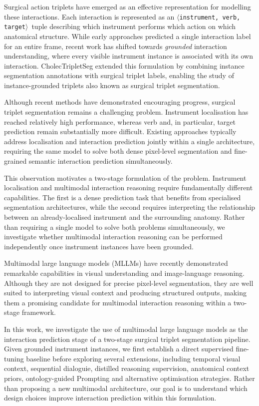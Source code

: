 \documentclass[11pt]{article}
\newcommand{\ivttriplet}{\texttt{$\langle$instrument, verb, target$\rangle$}\xspace}
\begin{document}
Surgical action triplets have emerged as an effective representation for modelling these interactions. Each interaction is represented as an \ivttriplet\ tuple describing which instrument performs which action on which anatomical structure. While early approaches predicted a single interaction label for an entire frame, recent work has shifted towards \emph{grounded} interaction understanding, where every visible instrument instance is associated with its own interaction. CholecTripletSeg extended this formulation by combining instance segmentation annotations with surgical triplet labels, enabling the study of instance-grounded triplets also known as surgical triplet segmentation.

Although recent methods have demonstrated encouraging progress, surgical triplet segmentation remains a challenging problem. Instrument localisation has reached relatively high performance, whereas verb and, in particular, target prediction remain substantially more difficult. Existing approaches typically address localisation and interaction prediction jointly within a single architecture, requiring the same model to solve both dense pixel-level segmentation and fine-grained semantic interaction prediction simultaneously.

This observation motivates a two-stage formulation of the problem. Instrument localisation and multimodal interaction reasoning require fundamentally different capabilities. The first is a dense prediction task that benefits from specialised segmentation architectures, while the second requires interpreting the relationship between an already-localised instrument and the surrounding anatomy. Rather than requiring a single model to solve both problems simultaneously, we investigate whether multimodal interaction reasoning can be performed independently once instrument instances have been grounded.

Multimodal large language models (MLLMs) have recently demonstrated remarkable capabilities in visual understanding and image-language reasoning. Although they are not designed for precise pixel-level segmentation, they are well suited to interpreting visual context and producing structured outputs, making them a promising candidate for multimodal interaction reasoning within a two-stage framework.

In this work, we investigate the use of multimodal large language models as the interaction prediction stage of a two-stage surgical triplet segmentation pipeline. Given grounded instrument instances, we first establish a direct supervised fine-tuning baseline before exploring several extensions, including temporal visual context, sequential dialoguie, distilled reasoning supervision, anatomical context priors, ontology-guided Prompting and alternative optimisation strategies. Rather than proposing a new multimodal architecture, our goal is to understand which design choices improve interaction prediction within this formulation.
\end{document}
